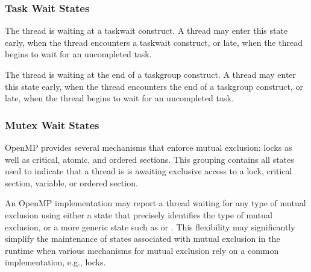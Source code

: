 \subsubsection{Task Wait States}

\begin{description}

\item {} 

  The thread is waiting at a taskwait construct. A 
  thread may enter this state early, when the
  thread encounters a taskwait construct, or late, when the thread
  begins to wait for an uncompleted task.

\item {} 

  The thread is waiting at the end of a taskgroup construct. A 
  thread may enter this state early, when the
  thread encounters the end of a taskgroup construct, or late, when the thread
  begins to wait for an uncompleted task.

\end{description}


\subsubsection{Mutex Wait States}

OpenMP provides several mechanisms that enforce mutual exclusion:
locks as well as critical, atomic, and ordered sections.  This
grouping contains all states used to indicate that a thread is is
awaiting exclusive access to a lock, critical section, variable,
or ordered section.

An OpenMP implementation may report a thread waiting for any type
of mutual exclusion using either a state that precisely identifies
the type of mutual exclusion, or  a more generic state such as
 or .  This
flexibility may significantly simplify the maintenance of states
associated with mutual exclusion in the runtime when various
mechanisms for mutual exclusion rely on a common implementation,
e.g., locks.


